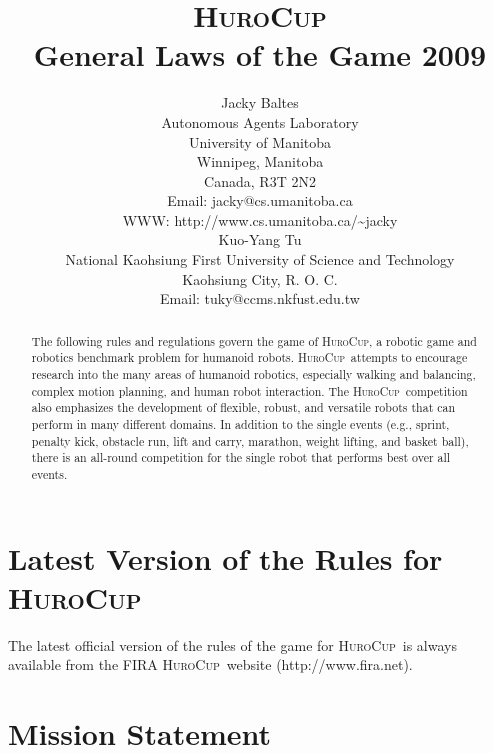 \documentclass[12pt]{article}
\newcommand{\HuroCup}{\textsc{HuroCup}}
\begin{document}
\title{\HuroCup\\
  General Laws of the Game 2009}

\author{Jacky Baltes\\
Autonomous Agents Laboratory\\
University of Manitoba\\
Winnipeg, Manitoba\\
Canada, R3T 2N2\\
Email: jacky@cs.umanitoba.ca\\
WWW: http://www.cs.umanitoba.ca/\~{ }jacky\\[5mm]
Kuo-Yang Tu\\
National Kaohsiung First University of Science and Technology\\
Kaohsiung City, R. O. C.\\
Email: tuky@ccms.nkfust.edu.tw\\
}

\maketitle
\begin{abstract}
The following rules and regulations govern the game of \HuroCup, a
robotic game and robotics benchmark problem for humanoid
robots. 
%
\HuroCup\ attempts to encourage research into the many areas
of humanoid robotics, especially walking and balancing, complex motion
planning, and human robot interaction.
%
The \HuroCup\ competition also emphasizes the development of flexible,
robust, and versatile robots that can perform in many different
domains. 
%
In addition to the single events (e.g., sprint, penalty kick, obstacle
run, lift and carry, marathon, weight lifting, and basket ball), there
is an all-round competition for the single robot that performs best
over all events.
\end{abstract}

\section*{Latest Version of the Rules for \HuroCup}
\label{sec:updates}

The latest official version of the rules of the game for \HuroCup\ is
always available from the FIRA \HuroCup\ website (http://www.fira.net).

\newpage

\section{Mission Statement}
\end{document}
